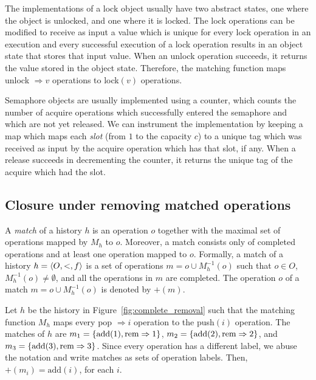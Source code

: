 \begin{example}[Locks]

  The implementations of a lock object usually have two abstract states, one
  where the object is unlocked, and one where it is locked. The lock operations
  can be modified to receive as input a value which is unique for every lock
  operation in an execution and every successful execution of a lock operation
  results in an object state that stores that input value. When an unlock
  operation succeeds, it returns the value stored in the object state.
  Therefore, the matching function maps unlock $\Rightarrow v$ operations to
  lock$(v)$ operations.

\end{example}

\begin{example}[Semaphores]

  Semaphore objects are usually implemented using a counter, which counts the
  number of acquire operations which successfully entered the semaphore and
  which are not yet released. We can instrument the implementation by keeping a
  map which maps each \emph{slot} (from $1$ to the capacity $c$) to a unique
  tag which was received as input by the acquire operation which has that slot,
  if any. When a release succeeds in decrementing the counter, it returns the
  unique tag of the acquire which had the slot.

\end{example}

\subsection{Closure under removing matched operations}

A \emph{match} of a history $h$ is an operation $o$ together with the maximal 
set of operations mapped by $M_h$ to $o$. 
Moreover, a match consists only of 
completed operations and at least one operation mapped to $o$. Formally, a match of a 
history $h={\langle{O,<,f}\rangle}$ is a set of operations $m=o\cup M^{-1}_h(o)$ such 
that $o\in O$, $M^{-1}_h(o)\neq \emptyset$, and all the operations in $m$
are completed. The operation $o$ of a match $m=o\cup M^{-1}_h(o)$ 
is denoted by $+(m)$.

\begin{example}

  Let $h$ be the history in Figure~\ref{fig:complete_removal} such that the
  matching function $M_h$ maps every pop $\Rightarrow i$ operation to the
  push$(i)$ operation. The matches of $h$ are $m_1 = {\{  \text{add}(1),
  \text{rem}\Rightarrow 1  \}}$, $m_2 = {\{  \text{add}(2),
  \text{rem}\Rightarrow 2  \}}$, and $m_3 = {\{  \text{add}(3),
  \text{rem}\Rightarrow 3  \}}$. Since every operation has a different label, we
  abuse the notation and write matches as sets of operation labels. Then,
  $+(m_i) = \text{add}(i)$, for each $i$.

\end{example}

